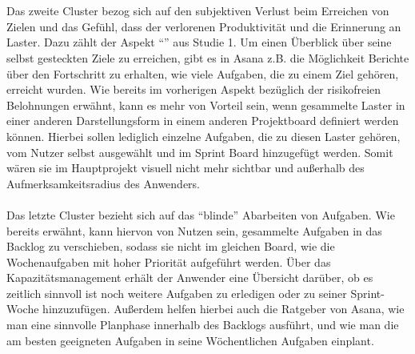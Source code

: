 \documentclass[sigconf, nonacm]{acmart}
\begin{document}
\\
\\
Das zweite Cluster bezog sich auf den subjektiven Verlust beim Erreichen von Zielen und das Gefühl, dass der verlorenen Produktivität und die Erinnerung an Laster. Dazu zählt der Aspekt \enquote{} aus Studie 1.
Um einen Überblick über seine selbst gesteckten Ziele zu erreichen, gibt es in Asana z.B. die Möglichkeit Berichte über den Fortschritt zu erhalten, wie viele Aufgaben, die zu einem Ziel gehören, erreicht wurden. Wie bereits im vorherigen Aspekt bezüglich der risikofreien Belohnungen erwähnt, kann es mehr von Vorteil sein, wenn gesammelte Laster in einer anderen Darstellungsform in einem anderen Projektboard definiert werden können. Hierbei sollen lediglich einzelne Aufgaben, die zu diesen Laster gehören, vom Nutzer selbst ausgewählt und im Sprint Board hinzugefügt werden. Somit wären sie im Hauptprojekt visuell nicht mehr sichtbar und außerhalb des Aufmerksamkeitsradius des Anwenders.
\\
\\
Das letzte Cluster bezieht sich auf das \enquote{blinde} Abarbeiten von Aufgaben.
Wie bereits erwähnt, kann hiervon von Nutzen sein, gesammelte Aufgaben in das Backlog zu verschieben, sodass sie nicht im gleichen Board, wie die Wochenaufgaben mit hoher Priorität aufgeführt werden. Über das Kapazitätsmanagement erhält der Anwender eine Übersicht darüber, ob es zeitlich sinnvoll ist noch weitere Aufgaben zu erledigen oder zu seiner Sprint-Woche hinzuzufügen. Außerdem helfen hierbei auch die Ratgeber von Asana, wie man eine sinnvolle Planphase innerhalb des Backlogs ausführt, und wie man die am besten geeigneten Aufgaben in seine Wöchentlichen Aufgaben einplant.
\end{document}
